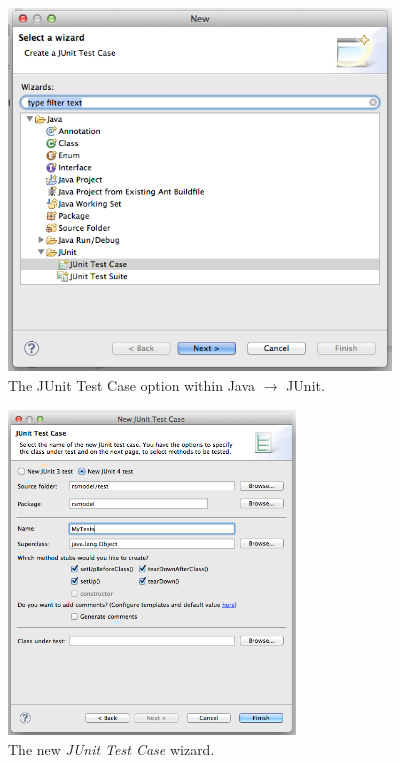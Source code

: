 \documentclass[11pt]{amsart}
\begin{document}
\begin{enumerate}
\begin{figure}
\begin{center}
\vspace{.2in}
\centerline {
\includegraphics[width=4in]{RepastModelTestingImages/JUnitTestCase.png}
}
\caption{The JUnit Test Case option within Java $\rightarrow$ JUnit.}
\label{fig:JUnitTestCase}
\end{center}
\end{figure}

\begin{figure}
\begin{center}
\vspace{.2in}
\centerline {
\includegraphics[width=3in]{RepastModelTestingImages/NewJUnitTestCase.png}
}
\caption{The new \emph{JUnit Test Case} wizard.}
\label{fig:NewJUnitTestCase}
\end{center}
\end{figure}


\end{enumerate}
\end{document}
